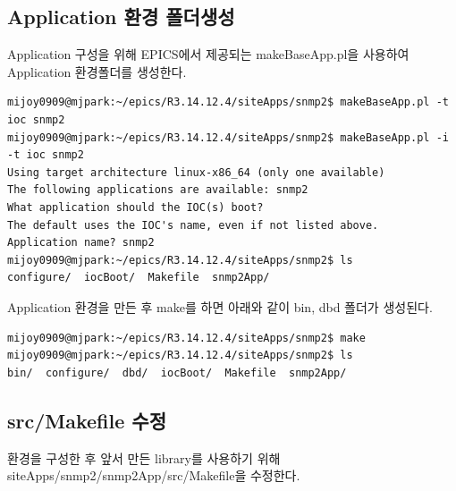 \documentclass[11pt
  , a4paper
  , article
  , oneside
]{memoir}
\begin{document}
\subsection{Application 환경 폴더생성}
Application 구성을 위해 EPICS에서 제공되는 makeBaseApp.pl을 사용하여 Application 환경폴더를 생성한다.

\begin{lstlisting}[style=termstyle]
mijoy0909@mjpark:~/epics/R3.14.12.4/siteApps/snmp2$ makeBaseApp.pl -t ioc snmp2
mijoy0909@mjpark:~/epics/R3.14.12.4/siteApps/snmp2$ makeBaseApp.pl -i -t ioc snmp2
Using target architecture linux-x86_64 (only one available)
The following applications are available: snmp2
What application should the IOC(s) boot?
The default uses the IOC's name, even if not listed above.
Application name? snmp2
mijoy0909@mjpark:~/epics/R3.14.12.4/siteApps/snmp2$ ls
configure/  iocBoot/  Makefile  snmp2App/
\end{lstlisting}

Application 환경을 만든 후 make를 하면 아래와 같이 bin, dbd 폴더가 생성된다.
\begin{lstlisting}[style=termstyle]
mijoy0909@mjpark:~/epics/R3.14.12.4/siteApps/snmp2$ make
mijoy0909@mjpark:~/epics/R3.14.12.4/siteApps/snmp2$ ls
bin/  configure/  dbd/  iocBoot/  Makefile  snmp2App/
\end{lstlisting}

\subsection{src/Makefile 수정}
환경을 구성한 후 앞서 만든 library를 사용하기 위해 siteApps/snmp2/snmp2App/src/Makefile을 수정한다.
\end{document}
